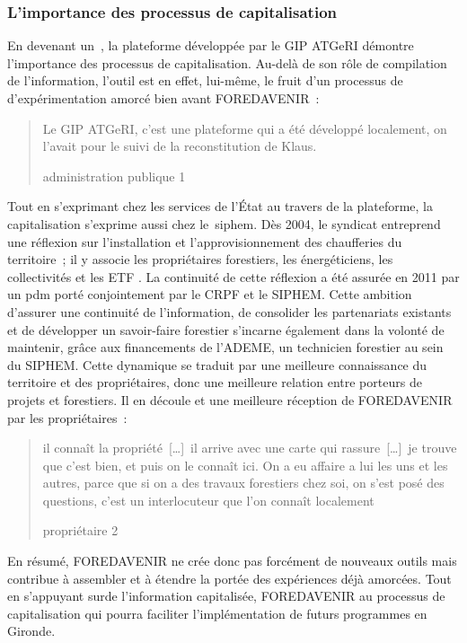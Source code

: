 \documentclass[12pt]{report}
\newcommand\indexp[1]{#1\index{#1}}
\begin{document}
\subsubsection{L'importance des processus de capitalisation}

En devenant un~, la plateforme développée par le GIP ATGeRI
démontre l'importance des processus de capitalisation. Au-delà de son rôle de
compilation de l'information, l'outil est en effet, lui-même, le fruit d'un
processus de d'expérimentation amorcé bien avant FOREDAVENIR~: \blockquote[administration
publique 1]{Le GIP ATGeRI, c’est une plateforme qui a été développé localement,
on l’avait pour le suivi de la reconstitution de Klaus.}

Tout en s'exprimant chez les services de l'État au travers de la plateforme, la
capitalisation s'exprime aussi chez le~\gls{siphem}. Dès 2004, le syndicat
entreprend une réflexion sur l'installation et l'approvisionnement des chaufferies du territoire~;
il y associe les propriétaires forestiers, les énergéticiens, les
collectivités et les ETF \citep{BEbanosDehez_ref78}. La continuité de cette réflexion a été assurée en
2011 par un \gls{pdm} porté conjointement par le \indexp{CRPF}
et le SIPHEM. Cette ambition d'assurer une continuité
de l’information, de consolider les partenariats existants et de développer
un savoir-faire forestier s’incarne également dans la volonté de maintenir, grâce
aux financements de l’ADEME, un technicien forestier au sein du SIPHEM. Cette
dynamique se traduit par une meilleure connaissance du territoire et des
propriétaires, donc une meilleure relation entre porteurs de projets et
forestiers. Il en découle
et une meilleure réception de FOREDAVENIR par les propriétaires~:
\blockquote[propriétaire 2]{il connaît la propriété~[\ldots]~il arrive avec une
carte qui rassure~[\ldots]~je trouve que c'est bien, et puis on le connaît ici.
On a eu affaire a lui les uns et les autres, parce que si on a des travaux
forestiers chez soi, on s'est posé des questions, c'est un interlocuteur que
l'on connaît localement}


En résumé, FOREDAVENIR ne crée donc pas forcément de nouveaux outils mais
contribue à assembler et à étendre la portée des expériences déjà amorcées. Tout
en s'appuyant surde l'information capitalisée, FOREDAVENIR au processus de
capitalisation qui
pourra faciliter l'implémentation de futurs programmes en Gironde.
\end{document}
